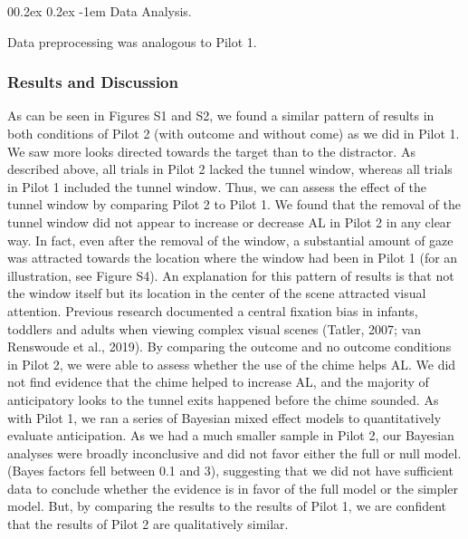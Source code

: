 \documentclass[
  man, donotrepeattitle,floatsintext]{apa6}
\makeatletter
\let\oldparagraph\paragraph
\renewcommand{\paragraph}{
    \@ifstar
      \xxxParagraphStar
      \xxxParagraphNoStar
  }
\newcommand{\xxxParagraphStar}[1]{\oldparagraph*{#1}\mbox{}}
\newcommand{\xxxParagraphNoStar}[1]{\oldparagraph{#1}\mbox{}}
\renewcommand{\paragraph}{\@startsection{paragraph}{4}{\parindent}%
  {0\baselineskip \@plus 0.2ex \@minus 0.2ex}%
  {-1em}%
  {\normalfont\normalsize\bfseries\itshape\typesectitle}}
\makeatother
\begin{document}
\paragraph{Data Analysis.}\label{data-analysis.-1}

Data preprocessing was analogous to Pilot 1.

\subsubsection{Results and Discussion}\label{results-and-discussion}

As can be seen in Figures S1 and S2, we found a similar pattern of results in both conditions of Pilot 2 (with outcome and without come) as we did in Pilot 1. We saw more looks directed towards the target than to the distractor. As described above, all trials in Pilot 2 lacked the tunnel window, whereas all trials in Pilot 1 included the tunnel window. Thus, we can assess the effect of the tunnel window by comparing Pilot 2 to Pilot 1. We found that the removal of the tunnel window did not appear to increase or decrease AL in Pilot 2 in any clear way. In fact, even after the removal of the window, a substantial amount of gaze was attracted towards the location where the window had been in Pilot 1 (for an illustration, see Figure S4). An explanation for this pattern of results is that not the window itself but its location in the center of the scene attracted visual attention. Previous research documented a central fixation bias in infants, toddlers and adults when viewing complex visual scenes (Tatler, 2007; van Renswoude et al., 2019).
By comparing the outcome and no outcome conditions in Pilot 2, we were able to assess whether the use of the chime helps AL. We did not find evidence that the chime helped to increase AL, and the majority of anticipatory looks to the tunnel exits happened before the chime sounded. As with Pilot 1, we ran a series of Bayesian mixed effect models to quantitatively evaluate anticipation. As we had a much smaller sample in Pilot 2, our Bayesian analyses were broadly inconclusive and did not favor either the full or null model. (Bayes factors fell between 0.1 and 3), suggesting that we did not have sufficient data to conclude whether the evidence is in favor of the full model or the simpler model. But, by comparing the results to the results of Pilot 1, we are confident that the results of Pilot 2 are qualitatively similar.
\end{document}

